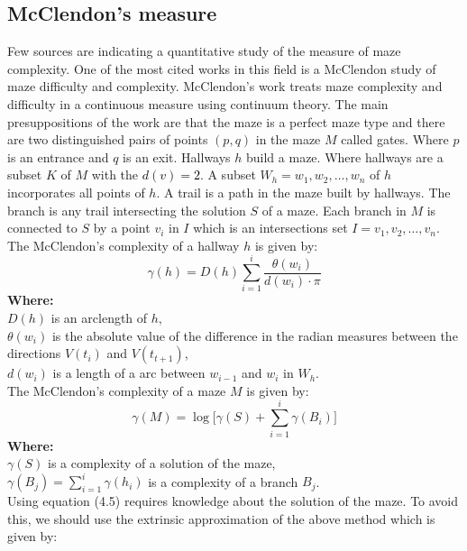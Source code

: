 \subsection{McClendon's measure}
Few sources are indicating a quantitative study of the measure of maze complexity. One of the most cited works in this field is a McClendon \textcolor{black}{\cite{14}} study of maze difficulty and complexity. 
McClendon’s work treats maze complexity and difficulty in a continuous measure using continuum theory. The main presuppositions of the work are that the maze is a perfect maze type and there are two distinguished pairs of points $(p,q)$ in the maze $M$ called gates. Where $p$ is an entrance and $q$ is an exit.  Hallways  $h$ build a maze. 
Where hallways are a subset $K$ of $M$ with the \textcolor{black}{$d(v) = 2$}. A subset $W_h = {w_1,w_2,\ldots, w_n}$ of $h$ incorporates all points of $h$. 
A trail is a path in the maze built by hallways. The branch is any trail intersecting the solution $S$ of a maze. Each branch in $M$ is connected to $S$ by a point $v_i$ in $I$ which is an intersections set $I = {v_1,v_2,\dots, v_n}$. The McClendon’s complexity of a hallway $h$ is given by:\\
\begin{equation}
\gamma(h) = D(h)\sum_{i = 1}^{i} \frac{\theta(w_i)}{d(w_i)\cdot \pi}
\end{equation}
\textbf{Where:}\\
$D(h)$ is an arclength of $h$,\\ 
$\theta(w_i)$ is the absolute value of the difference in the radian measures between the directions $V(t_i)$ and $V(t_{t+1})$,\\ 
$d(w_i)$ is a length of a arc between $w_{i-1}$ and $w_i$ in $W_h$.\\ 
\newline
The McClendon’s complexity of a maze $M$ is given by:\\
\begin{equation}
\gamma(M)=\log\bigl[\gamma(S) + \sum_{i = 1}^{i} \gamma(B_i) \bigr]
\end{equation}
\textbf{Where:}\\
$\gamma(S)$ is a complexity of a solution of the maze,\\
$\gamma(B_j) = \sum_{i = 1}^{i} \gamma(h_i)$ is a complexity of a branch $B_j$.\\
\newline 
Using equation (4.5) requires knowledge about the solution of the maze. To avoid this, we should use the extrinsic approximation of the above method which is given by:\\
